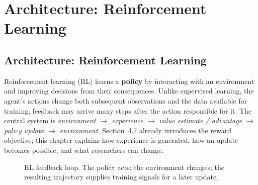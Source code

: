 \chapter{Architecture: Reinforcement Learning}
\label{chap:arch_rl}


\section{Architecture: Reinforcement Learning}\label{sec:rl}
Reinforcement learning (RL) learns a \textbf{policy} by interacting with an environment and improving decisions from their consequences.
Unlike supervised learning, the agent's actions change both subsequent observations and the data available for training; feedback may arrive many steps after the action responsible for it.
The central system is \emph{environment $\rightarrow$ experience $\rightarrow$ value estimate / advantage $\rightarrow$ policy update $\rightarrow$ environment}.
Section~4.7 already introduces the reward objective; this chapter explains how experience is generated, how an update becomes possible, and what researchers can change.

\begin{figure}[!htbp]\centering
{}
\caption{RL feedback loop. The policy acts; the environment changes; the resulting trajectory supplies training signals for a later update.}
\label{fig:rl-loop}
\end{figure}

